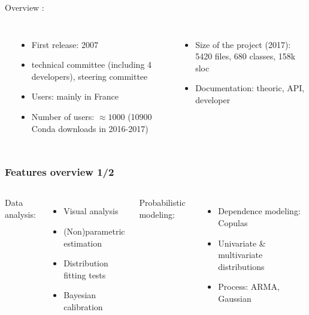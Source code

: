 \documentclass{beamer}
\begin{document}
\begin{frame}[containsverbatim]

Overview :
  \begin{columns}
\frametitle{\ot{}}
\begin{itemize}
\item First release: 2007
\item technical committee (including 4 developers), steering committee
\item Users: mainly in France
\item Number of users: $\approx 1000$ (10900 Conda downloads in 2016-2017)
\end{itemize}


\frametitle{\ot{}}
\begin{itemize}
\item Size of the project (2017): 5420 files, 680 classes, 158k sloc
\item Documentation: theoric, API, developer
\end{itemize}

\end{columns}

\end{frame}


\begin{frame}[containsverbatim]
\frametitle{Features overview 1/2}

  \begin{columns}
Data analysis:
\begin{itemize}
\item Visual analysis
\item (Non)parametric estimation
\item Distribution fitting tests
\item Bayesian calibration
\end{itemize}


Probabilistic modeling:
\begin{itemize}
\item Dependence modeling: Copulas
\item Univariate \& multivariate distributions
\item Process: ARMA, Gaussian
\end{itemize}

\end{columns}

\end{frame}
\end{document}
